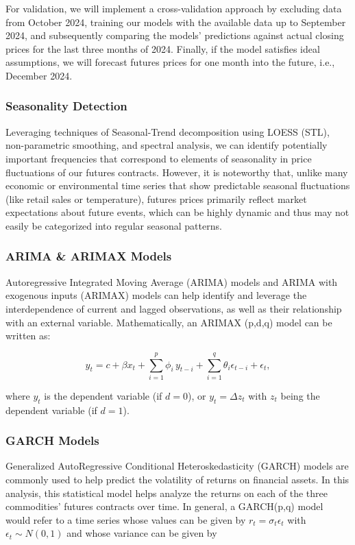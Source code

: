 \documentclass[11pt]{article}
\begin{document}
For validation, we will implement a cross-validation approach by excluding data from October 2024, training our models with the available data up to September 2024, and subsequently comparing the models' predictions against actual closing prices for the last three months of 2024. Finally, if the model satisfies ideal assumptions, we will forecast futures prices for one month into the future, i.e., December 2024.

\subsubsection{Seasonality Detection}

Leveraging techniques of Seasonal-Trend decomposition using LOESS (STL), non-parametric smoothing, and spectral analysis, we can identify potentially important frequencies that correspond to elements of seasonality in price fluctuations of our futures contracts. However, it is noteworthy that, unlike many economic or environmental time series that show predictable seasonal fluctuations (like retail sales or temperature), futures prices primarily reflect market expectations about future events, which can be highly dynamic and thus may not easily be categorized into regular seasonal patterns.

\subsubsection{ARIMA \& ARIMAX Models}

Autoregressive Integrated Moving Average (ARIMA) models and ARIMA with exogenous inputs (ARIMAX) models can help identify and leverage the interdependence of current and lagged observations, as well as their relationship with an external variable. Mathematically, an ARIMAX (p,d,q) model can be written as:

\begin{equation}
y_{t} = c + \beta x_{t} + \sum_{i=1}^{p}\phi_{i}\,y_{t-i} + \sum_{i=1}^{q}\theta_{i}\epsilon_{t-i} + \epsilon_{t},
\end{equation}

where $y_{t}$ is the dependent variable (if $d = 0$), or $y_{t} = \Delta z_{t}$ with $z_{t}$ being the dependent variable (if $d = 1$).

\subsubsection{GARCH Models}

Generalized AutoRegressive Conditional Heteroskedasticity (GARCH) models are commonly used to help predict the volatility of returns on financial assets. In this analysis, this statistical model helps analyze the returns on each of the three commodities' futures contracts over time. In general, a GARCH(p,q) model would refer to a time series whose values can be given by $r_{t} = \sigma_{t}\epsilon_{t}$ with $\epsilon_{t} \sim N(0,1)$ and whose variance can be given by
\end{document}
